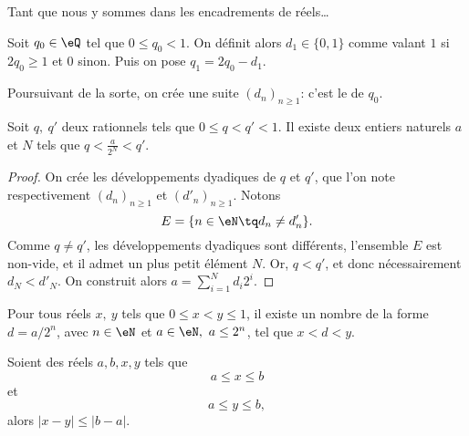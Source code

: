 Tant que nous y sommes dans les encadrements de réels\dots
\begin{normaltext}
  Soit \(q_0 \in \eQ \) tel que \( 0 \leq q_0 < 1 \). On définit alors \( d_1 \in \{0, 1\} \) comme valant \( 1 \) si \( 2 q_0 \geq 1 \) et \(0 \) sinon. Puis on pose \( q_1 = 2 q_0 - d_1 \).

  Poursuivant de la sorte, on crée une suite \( (d_n)_{n\geq 1} \): c'est le  de \( q_0 \).
\end{normaltext}

\begin{lemma}        \label{LEMooRSLIooVrZMxM}
  Soit \( q,\ q' \) deux rationnels tels que \( 0 \leq q < q' < 1 \). Il existe deux entiers naturels \( a \) et \( N \) tels que \( q < \frac a {2^N} < q' \).
\end{lemma}
\begin{proof}
  On crée les développements dyadiques de \( q \) et \( q' \), que l'on note respectivement \( (d_n)_{n\geq 1} \) et \( (d'_n)_{n\geq 1} \). Notons
  \begin{equation}
    E = \{ n \in \eN \tq d_n \neq d'_n \}.
  \end{equation}
Comme \( q \neq q' \), les développements dyadiques sont différents, l'ensemble \(E\) est non-vide, et il admet un plus petit élément \(N \). Or, \( q < q' \), et donc nécessairement \( d_N < d'_N \). On construit alors \( a = \sum_{i=1}^{N} d_i 2^i \). 
\end{proof}

\begin{corollary}\label{CorDensiteDyadiques}
  Pour tous réels \(x,\ y\) tels que \( 0 \leq x < y \leq 1 \), il existe un nombre de la forme \( d = a / 2^n \), avec \( n \in \eN \) et \( a \in \eN,\ a \leq 2^n\), tel que \( x < d < y \).
\end{corollary}

\begin{lemma}        \label{LEMooEGYLooCGrDrl}
    Soient des réels \( a,b,x,y\) tels que
    \begin{equation}
        a\leq x\leq b
    \end{equation}
    et
    \begin{equation}
        a\leq y\leq b,
    \end{equation}
    alors \( | x-y |\leq | b-a |\).
\end{lemma}

